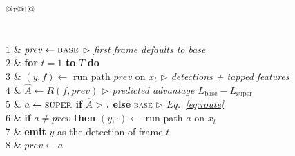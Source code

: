 \begin{algorithm}[t]
\caption{Causal budget-adaptive depth routing (deployment)}
\label{alg:routing}
\small
\begin{tabular}{@{}r@{\hspace{5pt}}l@{}}
\\
\\
\\[1pt]
$1$ & $\mathit{prev}\leftarrow\textsc{base}$ \hfill{\footnotesize\itshape $\triangleright$ first frame defaults to base}\\
$2$ & \textbf{for} $t=1$ \textbf{to} $T$ \textbf{do}\\
$3$ & \quad $(y,f)\leftarrow$ run path $\mathit{prev}$ on $x_t$ \hfill{\footnotesize\itshape $\triangleright$ detections + tapped features}\\
$4$ & \quad $\hat{A}\leftarrow R(f,\mathit{prev})$ \hfill{\footnotesize\itshape $\triangleright$ predicted advantage $L_{\mathrm{base}}{-}L_{\mathrm{super}}$}\\
$5$ & \quad $a\leftarrow\textsc{super}$ \textbf{if} $\hat{A}>\tau$ \textbf{else} \textsc{base} \hfill{\footnotesize\itshape $\triangleright$ Eq.~\eqref{eq:route}}\\
$6$ & \quad \textbf{if} $a\neq\mathit{prev}$ \textbf{then} $(y,\cdot)\leftarrow$ run path $a$ on $x_t$\\
$7$ & \quad \textbf{emit} $y$ as the detection of frame $t$\\
$8$ & \quad $\mathit{prev}\leftarrow a$\\
\end{tabular}
\end{algorithm}

